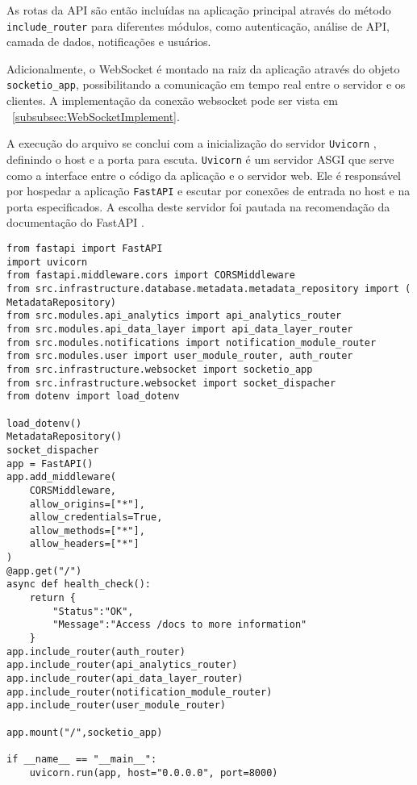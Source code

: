 As rotas da \gls{API} são então incluídas na aplicação principal através do método \texttt{include\_router} para diferentes módulos, como autenticação, análise de API, camada de dados, notificações e usuários.

Adicionalmente, o WebSocket é montado na raiz da aplicação através do objeto \texttt{socketio\_app}, possibilitando a comunicação em tempo real entre o servidor e os clientes. A implementação da conexão websocket pode ser vista em ~\ref{subsubsec:WebSocketImplement}.


A execução do arquivo se conclui com a inicialização do servidor \texttt{Uvicorn} \cite{uvicornOfficialDocs}, definindo o host e a porta para escuta. \texttt{Uvicorn} é um servidor \gls{ASGI} que serve como a interface entre o código da aplicação e o servidor web. Ele é responsável por hospedar a aplicação \texttt{FastAPI} e escutar por conexões de entrada no host e na porta especificados. A escolha deste servidor foi pautada na recomendação da documentação do FastAPI \cite{fastapiTutorial}.

\begin{verbatim}
from fastapi import FastAPI
import uvicorn
from fastapi.middleware.cors import CORSMiddleware
from src.infrastructure.database.metadata.metadata_repository import (
MetadataRepository)
from src.modules.api_analytics import api_analytics_router
from src.modules.api_data_layer import api_data_layer_router
from src.modules.notifications import notification_module_router
from src.modules.user import user_module_router, auth_router
from src.infrastructure.websocket import socketio_app
from src.infrastructure.websocket import socket_dispacher
from dotenv import load_dotenv

load_dotenv()
MetadataRepository()
socket_dispacher
app = FastAPI()
app.add_middleware(
    CORSMiddleware,
    allow_origins=["*"],
    allow_credentials=True,
    allow_methods=["*"],
    allow_headers=["*"]
)
@app.get("/")
async def health_check():
    return {
        "Status":"OK",
        "Message":"Access /docs to more information"    
    }
app.include_router(auth_router)
app.include_router(api_analytics_router)
app.include_router(api_data_layer_router)
app.include_router(notification_module_router)
app.include_router(user_module_router)

app.mount("/",socketio_app)

if __name__ == "__main__":
    uvicorn.run(app, host="0.0.0.0", port=8000)
\end{verbatim}

